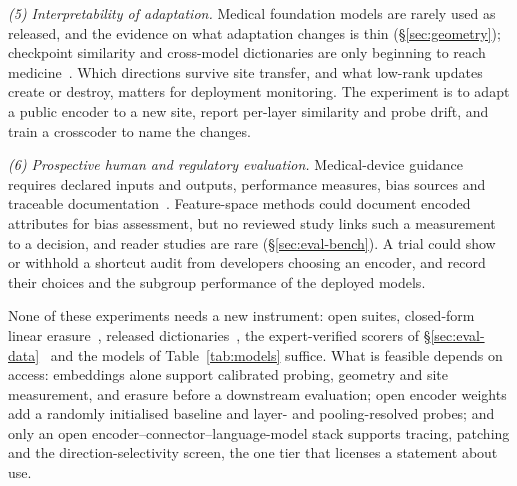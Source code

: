 \textit{(5) Interpretability of adaptation.} Medical foundation models are rarely used as released, and
the evidence on what adaptation changes is thin (\S\ref{sec:geometry}); checkpoint similarity and
cross-model dictionaries are only beginning to reach medicine~\cite{minder2025overcoming,ahmed2026medseglens}.
Which directions survive site transfer, and what low-rank updates create or destroy, matters for
deployment monitoring. The experiment is to adapt a public encoder to a new site, report per-layer
similarity and probe drift, and train a crosscoder to name the changes.

\textit{(6) Prospective human and regulatory evaluation.} Medical-device guidance requires declared
inputs and outputs, performance measures, bias sources and traceable
documentation~\cite{fda2025aiguidance,euaiact2024}. Feature-space methods could document encoded
attributes for bias assessment, but no reviewed study links such a measurement to a decision, and
reader studies are rare (\S\ref{sec:eval-bench}). A trial could show or withhold a shortcut audit from
developers choosing an encoder, and record their choices and the subgroup performance of the deployed
models.

None of these experiments needs a new instrument: open suites, closed-form linear
erasure~\cite{belrose2023leace}, released dictionaries~\cite{abdulaal2024an,nooralahzadeh2026universal},
the expert-verified scorers of \S\ref{sec:eval-data}~\cite{kim2024transparent} and the models of
Table~\ref{tab:models} suffice. What is feasible depends on access: embeddings alone support calibrated probing, geometry and site measurement, and erasure before
a downstream evaluation; open encoder weights add a randomly initialised baseline and layer- and
pooling-resolved probes; and only an open encoder--connector--language-model stack supports tracing,
patching and the direction-selectivity screen, the one tier that licenses a statement about use.
